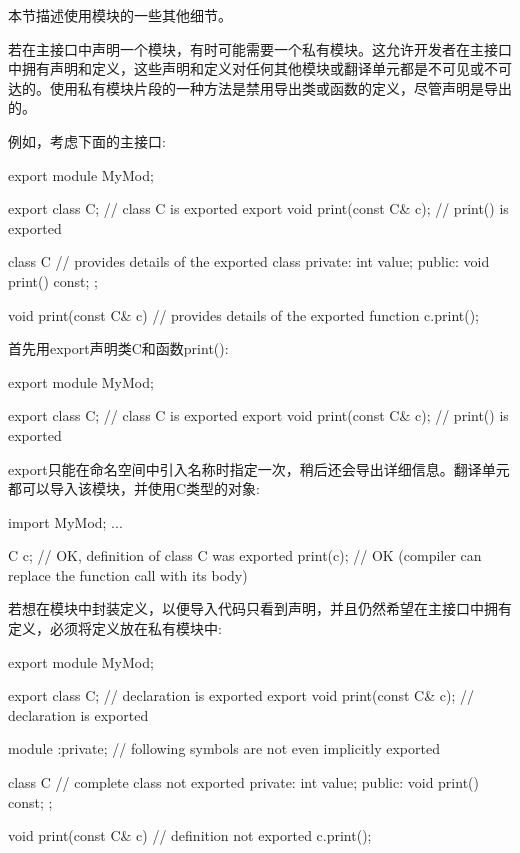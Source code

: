 
本节描述使用模块的一些其他细节。


若在主接口中声明一个模块，有时可能需要一个私有模块。这允许开发者在主接口中拥有声明和定义，这些声明和定义对任何其他模块或翻译单元都是不可见或不可达的。使用私有模块片段的一种方法是禁用导出类或函数的定义，尽管声明是导出的。

例如，考虑下面的主接口:

\begin{cpp}
export module MyMod;

export class C; // class C is exported
export void print(const C& c); // print() is exported

class C { // provides details of the exported class
private:
	int value;
public:
	void print() const;
};

void print(const C& c) { // provides details of the exported function
	c.print();
}
\end{cpp}

首先用export声明类C和函数print():

\begin{cpp}
export module MyMod;

export class C; // class C is exported
export void print(const C& c); // print() is exported
\end{cpp}

export只能在命名空间中引入名称时指定一次，稍后还会导出详细信息。翻译单元都可以导入该模块，并使用C类型的对象:

\begin{cpp}
import MyMod;
...

C c; // OK, definition of class C was exported
print(c); // OK (compiler can replace the function call with its body)
\end{cpp}

若想在模块中封装定义，以便导入代码只看到声明，并且仍然希望在主接口中拥有定义，必须将定义放在私有模块中:

\begin{cpp}
export module MyMod;

export class C; // declaration is exported
export void print(const C& c); // declaration is exported

module :private; // following symbols are not even implicitly exported

class C { // complete class not exported
	private:
	int value;
	public:
	void print() const;
};

void print(const C& c) { // definition not exported
	c.print();
}
\end{cpp}

